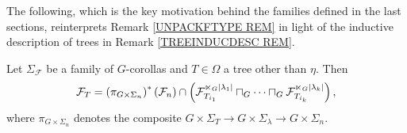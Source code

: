 \documentclass[a4paper,10pt]{article}%
\begin{document}
The following, which is the key motivation behind the families defined in the last sections,
reinterprets 
Remark \ref{UNPACKFTYPE REM}
in light of the inductive description of trees in
Remark \ref{TREEINDUCDESC REM}.


\begin{lemma}\label{KEYLEMMAGECO LEM}
Let $\Sigma_\mathcal{F}$ be a family of $G$-corollas and 
$T \in \Omega$ a tree other than $\eta$. Then
\begin{equation}\label{KEYLEMMAGECO EQ}
	\mathcal{F}_T =
	\left(\pi_{G \times \Sigma_n}\right)^{\**}(\mathcal{F}_n)
		\cap
	\left(
	\mathcal{F}_{T_{i_1}}^{\ltimes_G |\lambda_1|}
		\sqcap_G \cdots \sqcap_G
	\mathcal{F}_{T_{i_k}}^{\ltimes_G |\lambda_k|}
	\right),
\end{equation}
where $\pi_{G \times \Sigma_n}$ denotes the composite
$G \times \Sigma_T \to G \times \Sigma_{\lambda} \to
 G \times \Sigma_n$.
\end{lemma}
\end{document}
